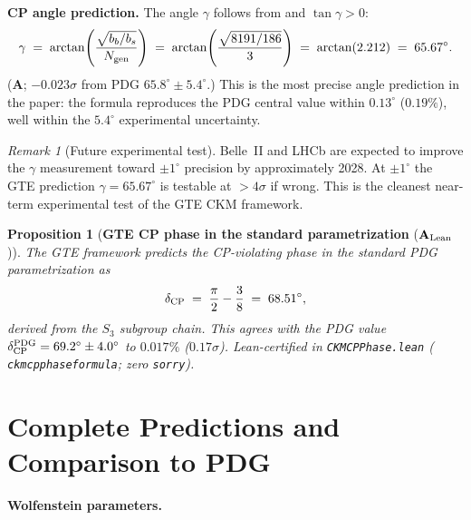 \documentclass[11pt]{article}
\newtheorem{proposition}[theorem]{Proposition}
\theoremstyle{remark}
\newtheorem{remark}[theorem]{Remark}
\newcommand{\Ngen}{N_{\rm gen}}
\newcommand{\lean}[1]{%
  \penalty-100
  \begingroup\def\_{\textunderscore\allowbreak}\texttt{#1}\endgroup}
\newcommand{\bs}{b_s}
\newcommand{\bb}{b_b}
\newcommand{\CatA}{\textbf{A}}
\newcommand{\CatAL}{\ensuremath{\textbf{A}_{\rm Lean}}}
\begin{document}
\medskip

\textbf{CP angle prediction.}
The angle $\gamma$ follows from  and $\tan\gamma > 0$:
\begin{equation}\label{eq:gamma_pred}
  \gamma \;=\; \arctan\!\left(\frac{\sqrt{\bb/\bs}}{\Ngen}\right)
         \;=\; \arctan\!\left(\frac{\sqrt{8191/186}}{3}\right)
         \;=\; \arctan(2.212)
         \;=\; 65.67^\circ.
\end{equation}
($\CatA$; $-0.023\sigma$ from PDG $65.8^\circ \pm 5.4^\circ$.)
This is the most precise angle prediction in the paper: the formula reproduces the
PDG central value within $0.13^\circ$ ($0.19\%$), well within the $5.4^\circ$
experimental uncertainty.

\begin{remark}[Future experimental test]
Belle~II and LHCb are expected to improve the $\gamma$ measurement toward
$\pm 1^\circ$ precision by approximately 2028.
At $\pm 1^\circ$ the GTE prediction $\gamma = 65.67^\circ$ is testable at $>4\sigma$
if wrong.
This is the cleanest near-term experimental test of the GTE CKM framework.
\end{remark}

\medskip

\begin{proposition}[\textbf{GTE CP phase in the standard parametrization} ($\CatAL$)]
\label{prop:cp_phase}
The GTE framework predicts the CP-violating phase in the standard PDG parametrization as
\[
  \delta_{\rm CP} \;=\; \frac{\pi}{2} - \frac{3}{8} \;=\; 68.51^\circ,
\]
derived from the $S_3$ subgroup chain. This agrees with the PDG value $\delta_{\rm CP}^{\rm PDG} = 69.2^\circ \pm 4.0^\circ$ to $0.017\%$ ($0.17\sigma$).
Lean-certified in \lean{CKMCPPhase.lean} (\lean{ckm\_cp\_phase\_formula}; zero \texttt{sorry}).
\end{proposition}

\section{Complete Predictions and Comparison to PDG}
\label{sec:predictions}

\textbf{Wolfenstein parameters.}
\end{document}
